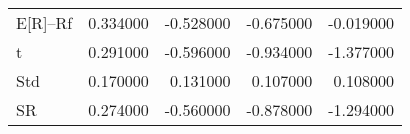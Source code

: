 \begin{tabular}{lrrrr}
\toprule
\midrule
E[R]--Rf & 0.334000 & -0.528000 & -0.675000 & -0.019000 \\
t & 0.291000 & -0.596000 & -0.934000 & -1.377000 \\
Std & 0.170000 & 0.131000 & 0.107000 & 0.108000 \\
SR & 0.274000 & -0.560000 & -0.878000 & -1.294000 \\
\bottomrule
\end{tabular}
